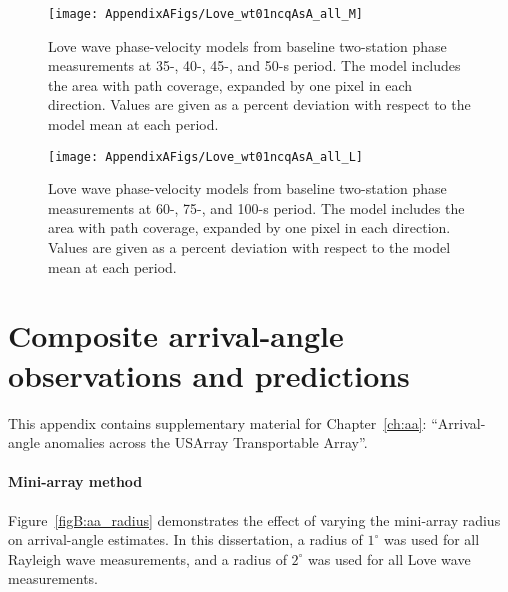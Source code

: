 \documentclass[12pt,oneside]{book}
\newcommand{\degree}[1]{\mbox{$#1^{\circ}$}}
\begin{document}
%
\begin{figure} 
\begin{center}
\texttt{[image: AppendixAFigs/Love\_wt01ncqAsA\_all\_M]} 
\caption[Love wave phase-velocity maps: 35-, 40-, 45-, and 50-s]{Love wave phase-velocity models from baseline two-station phase measurements at 35-, 40-, 45-, and 50-s period. The model includes the area with path coverage, expanded by one pixel in each direction. Values are given as a percent deviation with respect to the model mean at each period.}
\label{figA:L_M}
\end{center}
\end{figure}
%
\begin{figure} 
\begin{center}
\texttt{[image: AppendixAFigs/Love\_wt01ncqAsA\_all\_L]} 
\caption[Love wave phase-velocity maps: 60-, 75-, and 100-s]{Love wave phase-velocity models from baseline two-station phase measurements at 60-, 75-, and 100-s period. The model includes the area with path coverage, expanded by one pixel in each direction. Values are given as a percent deviation with respect to the model mean at each period.}
\label{figA:L_L}
\end{center}
\end{figure}
%

\singlespacing
\chapter[Composite arrival-angle observations and predictions]{Composite arrival-angle observations and predictions}
\label{appendixB}
\doublespacing

\begin{raggedright}
This appendix contains supplementary material for Chapter~\ref{ch:aa}: ``Arrival-angle anomalies across the USArray Transportable Array''. 
\end{raggedright}

\subsubsection*{Mini-array method}
Figure~\ref{figB:aa_radius} demonstrates the effect of varying the mini-array radius on arrival-angle estimates. In this dissertation, a radius of \degree{1} was used for all Rayleigh wave measurements, and a radius of \degree{2} was used for all Love wave measurements. 
\end{document}
